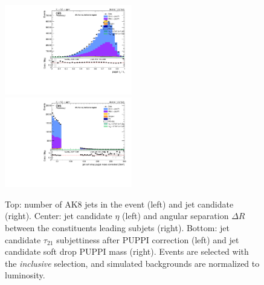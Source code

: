 \begin{figure}[!htb]
\begin{center}
    \includegraphics[width=0.495\textwidth]{plots/v9_U/XVZnnInc/FatJet1_puppiTau21.pdf}
    \includegraphics[width=0.495\textwidth]{plots/v9_U/XVZnnInc/FatJet1_softdropPuppiMassCorr.pdf}

    \caption{Top: number of AK8 jets in the event (left) and \V jet candidate \pt (right). Center: \V jet candidate $\eta$ (left) and angular separation $\Delta R$ between the constituents leading subjets (right). Bottom: \V jet candidate $\tau_{21}$ subjettiness after PUPPI correction (left) and \V jet candidate soft drop PUPPI mass (right). Events are selected with the \emph{inclusive} selection, and simulated backgrounds are normalized to luminosity.}
\label{fig:plot_uno}
  \end{center}
\end{figure}

